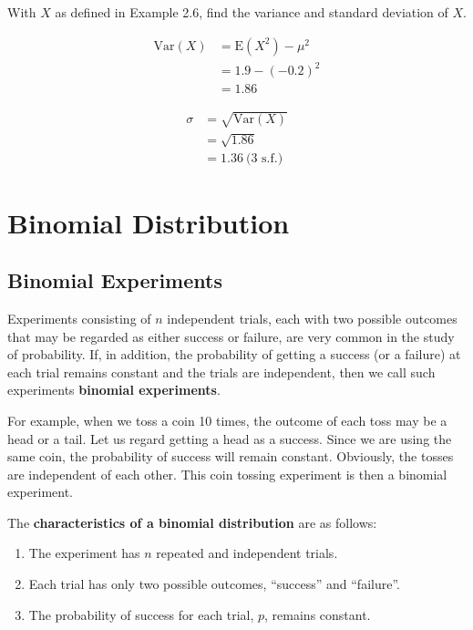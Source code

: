 \documentclass[11pt,a4paper]{book}
\begin{document}
\begin{example}

With $X$ as defined in \textsf{Example 2.6}, find the variance and standard
deviation of $X$.

\Solution

\begin{align*}
\text{Var}\left(X\right) & =\text{E}\left(X^{2}\right)-\mu^{2}\\
 & =1.9-\left(-0.2\right)^{2}\\
 & =1.86
\end{align*}

\begin{align*}
\sigma & =\sqrt{\text{Var}\left(X\right)}\\
 & =\sqrt{1.86}\\
 & =1.36\:\text{(3 s.f.)}
\end{align*}

\end{example}

\chapter{Binomial Distribution}

\section{Binomial Experiments}

Experiments consisting of $n$ independent trials, each with two possible outcomes that may be regarded as either success or failure, are very common in the study of probability. If, in addition, the probability of getting a success (or a failure) at each trial remains constant and the trials are independent, then we call such experiments \textbf{binomial experiments}.

For example, when we toss a coin 10 times, the outcome of each toss may be a head or a tail. Let us regard getting a head as a success. Since we are using the same coin, the probability of success will remain constant. Obviously, the tosses are independent of each other. This coin tossing experiment is then a binomial experiment.

\begin{tcolorbox}[colback=blue!5, colframe=black, boxrule=.4pt, sharpish corners]

The \textbf{characteristics of a binomial distribution} are as follows:

\begin{enumerate}[leftmargin=2cm]

\item  The experiment has $n$ repeated and independent trials.

\item  Each trial has only two possible outcomes, ``success'' and
``failure''.

\item  The probability of success for each trial, $p$, remains
constant.

\end{enumerate}
\end{tcolorbox}
\end{document}
